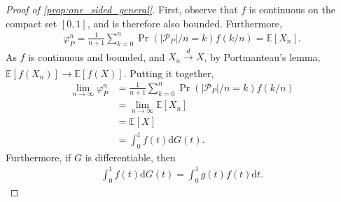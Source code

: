 \documentclass[a4paper]{article}
\newcommand{\dt}{\mathrm{d}t}
\newcommand{\dG}{\mathrm{d}G}
\newcommand{\E}{\mathbb{E}}
\begin{document}
\begin{proof}[Proof of \cref{prop:one_sided_general}]
    First, observe that $f$ is continuous on the compact set $[0, 1]$, and is therefore also bounded.
    Furthermore,
    \begin{align*}
        \varphi_P^n = \frac{1}{n+1} \sum_{k=0}^n \Pr(|\mathcal{P}_P| / n = k) f(k/n) = \E[X_n].
    \end{align*}
    As $f$ is continuous and bounded, and $X_n \xrightarrow[]{d} X$, by Portmanteau's lemma, $\E[f(X_n)] \to \E[f(X)]$.
    Putting it together,
    \begin{align*}
        \lim_{n \to \infty} \varphi_P^n &= \frac{1}{n+1} \sum_{k=0}^n \Pr(|\mathcal{P}_P| / n = k) f(k/n) \\
        &= \lim_{n \to \infty} \E[X_n] \\
        &= \E[X] \\
        &= \int_0^1 f(t) \dG(t).
    \end{align*}
    Furthermore, if $G$ is differentiable, then
    \begin{align*}
        \int_0^1 f(t) \dG(t) = \int_0^1 g(t) f(t) \dt.
    \end{align*}
\end{proof}
\end{document}

